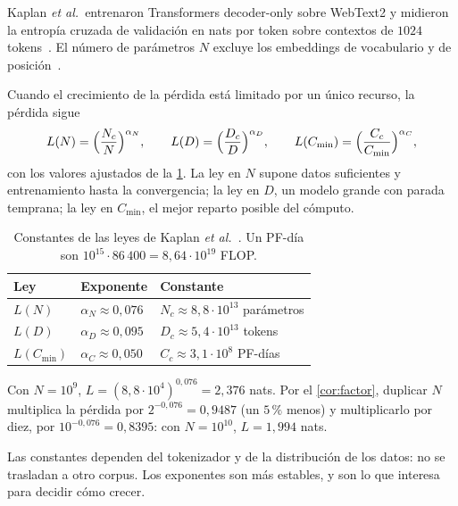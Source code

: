Kaplan \emph{et al.}\ entrenaron Transformers decoder-only sobre WebText2 y midieron la entropía cruzada de validación en nats por token sobre contextos de $1024$ tokens~\cite[§2]{kaplan}. El número de parámetros $N$ excluye los embeddings de vocabulario y de posición~\cite[§1.3]{kaplan}.

\begin{definicion}\label{def:kaplan}
Cuando el crecimiento de la pérdida está limitado por un único recurso, la pérdida sigue~\cite[ecuaciones~(1.1)--(1.3)]{kaplan}
\[
L(N)=\Bigl(\frac{N_c}{N}\Bigr)^{\alpha_N},\qquad
L(D)=\Bigl(\frac{D_c}{D}\Bigr)^{\alpha_D},\qquad
L(C_{\min})=\Bigl(\frac{C_c}{C_{\min}}\Bigr)^{\alpha_C},
\]
con los valores ajustados de la \cref{tab:kaplan}. La ley en $N$ supone datos suficientes y entrenamiento hasta la convergencia; la ley en $D$, un modelo grande con parada temprana; la ley en $C_{\min}$, el mejor reparto posible del cómputo.
\end{definicion}

\begin{table}[h]
\centering\small
\caption{Constantes de las leyes de Kaplan \emph{et al.}~\cite[§1.2]{kaplan}. Un PF-día son $10^{15}\cdot 86\,400=8{,}64\cdot 10^{19}$ FLOP.}\label{tab:kaplan}
\begin{tabular}{@{}lll@{}}
\toprule
Ley & Exponente & Constante \\
\midrule
$L(N)$ & $\alpha_N\approx 0{,}076$ & $N_c\approx 8{,}8\cdot 10^{13}$ parámetros \\
$L(D)$ & $\alpha_D\approx 0{,}095$ & $D_c\approx 5{,}4\cdot 10^{13}$ tokens \\
$L(C_{\min})$ & $\alpha_C\approx 0{,}050$ & $C_c\approx 3{,}1\cdot 10^{8}$ PF-días \\
\bottomrule
\end{tabular}
\end{table}

\begin{ejemplo}\label{ej:kaplan}
Con $N=10^{9}$, $L=(8{,}8\cdot 10^{4})^{0{,}076}=2{,}376$ nats. Por el \cref{cor:factor}, duplicar $N$ multiplica la pérdida por $2^{-0{,}076}=0{,}9487$ (un $5\,\%$ menos) y multiplicarlo por diez, por $10^{-0{,}076}=0{,}8395$: con $N=10^{10}$, $L=1{,}994$ nats.
\end{ejemplo}

Las constantes dependen del tokenizador y de la distribución de los datos: no se trasladan a otro corpus. Los exponentes son más estables, y son lo que interesa para decidir cómo crecer.


